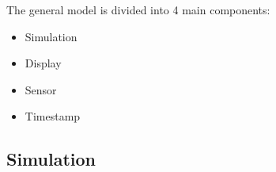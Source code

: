 

The general model is divided into 4 main components:
\begin{itemize}
\item Simulation
\item Display
\item Sensor
  \item Timestamp
\end{itemize}

\subsection{Simulation}


